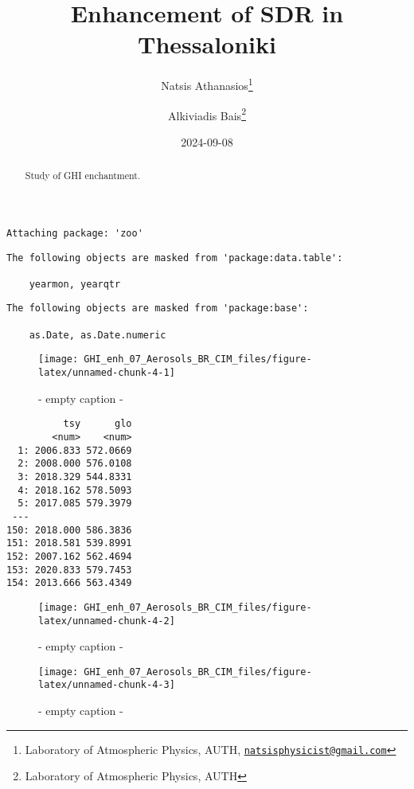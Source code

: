 \documentclass[
  10pt,
  a4paper,oneside]{article}
\title{Enhancement of SDR in Thessaloniki}
\author{Natsis Athanasios\footnote{Laboratory of Atmospheric Physics, AUTH, \href{mailto:natsisphysicist@gmail.com}{\nolinkurl{natsisphysicist@gmail.com}}} \and Alkiviadis Bais\footnote{Laboratory of Atmospheric Physics, AUTH}}
\date{2024-09-08}
\begin{document}
\maketitle
\begin{abstract}
Study of GHI enchantment.
\end{abstract}

{
\hypersetup{linkcolor=}
\setcounter{tocdepth}{4}
\tableofcontents
}
\begin{verbatim}
Attaching package: 'zoo'
\end{verbatim}

\begin{verbatim}
The following objects are masked from 'package:data.table':

    yearmon, yearqtr
\end{verbatim}

\begin{verbatim}
The following objects are masked from 'package:base':

    as.Date, as.Date.numeric
\end{verbatim}

\begin{figure}[H]

{\centering \texttt{[image: GHI\_enh\_07\_Aerosols\_BR\_CIM\_files/figure-latex/unnamed-chunk-4-1]} 

}

\caption{ - empty caption - }\label{fig:unnamed-chunk-4-1}
\end{figure}

\begin{verbatim}
          tsy      glo
        <num>    <num>
  1: 2006.833 572.0669
  2: 2008.000 576.0108
  3: 2018.329 544.8331
  4: 2018.162 578.5093
  5: 2017.085 579.3979
 ---                  
150: 2018.000 586.3836
151: 2018.581 539.8991
152: 2007.162 562.4694
153: 2020.833 579.7453
154: 2013.666 563.4349
\end{verbatim}

\begin{figure}[H]

{\centering \texttt{[image: GHI\_enh\_07\_Aerosols\_BR\_CIM\_files/figure-latex/unnamed-chunk-4-2]} 

}

\caption{ - empty caption - }\label{fig:unnamed-chunk-4-2}
\end{figure}
\begin{figure}[H]

{\centering \texttt{[image: GHI\_enh\_07\_Aerosols\_BR\_CIM\_files/figure-latex/unnamed-chunk-4-3]} 

}

\caption{ - empty caption - }\label{fig:unnamed-chunk-4-3}
\end{figure}
\end{document}
